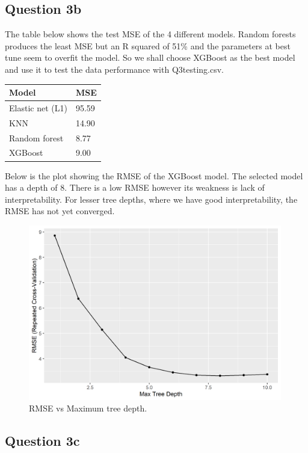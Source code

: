 \documentclass[
]{article}
\begin{document}
\hypertarget{question-3b}{%
\subsection{Question 3b}\label{question-3b}}

The table below shows the test MSE of the 4 different models. Random
forests produces the least MSE but an R squared of 51\% and the
parameters at best tune seem to overfit the model. So we shall choose
XGBoost as the best model and use it to test the data performance with
Q3testing.csv.

\begin{longtable}[]{@{}ll@{}}
\toprule\noalign{}
Model & MSE \\
\midrule\noalign{}
\endhead
\bottomrule\noalign{}
\endlastfoot
Elastic net (L1) & 95.59 \\
KNN & 14.90 \\
Random forest & 8.77 \\
XGBoost & 9.00 \\
\end{longtable}

Below is the plot showing the RMSE of the XGBoost model. The selected
model has a depth of 8. There is a low RMSE however its weakness is lack
of interpretability. For lesser tree depths, where we have good
interpretability, the RMSE has not yet converged.

\begin{figure}
\centering
\includegraphics[width=4.36458in,height=\textheight]{rmse_xgboost.png}
\caption{RMSE vs Maximum tree depth.}
\end{figure}

\hypertarget{question-3c}{%
\subsection{Question 3c}\label{question-3c}}
\end{document}

